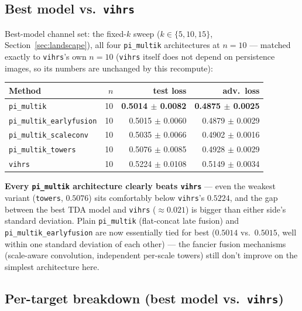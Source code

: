 \documentclass[11pt]{article}
\begin{document}
\subsection{Best model vs.\ \texttt{vihrs}}
\label{sec:bestvsvihrs}

Best-model channel set: the fixed-$k$ sweep ($k\in\{5,10,15\}$,
Section~\ref{sec:landscape}), all four \texttt{pi\_multik} architectures at
$n=10$ — matched exactly to \texttt{vihrs}'s own $n=10$ (\texttt{vihrs} itself
does not depend on persistence images, so its numbers are unchanged by this
recompute):

\begin{center}
\begin{tabular}{@{}lrrr@{}}
\toprule
\textbf{Method} & \textbf{$n$} & \textbf{test loss} & \textbf{adv.\ loss} \\
\midrule
\texttt{pi\_multik}              & 10 & \textbf{0.5014 $\pm$ 0.0082} & \textbf{0.4875 $\pm$ 0.0025} \\
\texttt{pi\_multik\_earlyfusion} & 10 & 0.5015 $\pm$ 0.0060 & 0.4879 $\pm$ 0.0029 \\
\texttt{pi\_multik\_scaleconv}   & 10 & 0.5035 $\pm$ 0.0066 & 0.4902 $\pm$ 0.0016 \\
\texttt{pi\_multik\_towers}      & 10 & 0.5076 $\pm$ 0.0085 & 0.4928 $\pm$ 0.0029 \\
\texttt{vihrs}                   & 10 & 0.5224 $\pm$ 0.0108 & 0.5149 $\pm$ 0.0034 \\
\bottomrule
\end{tabular}
\end{center}

\textbf{Every \texttt{pi\_multik} architecture clearly beats \texttt{vihrs}}
— even the weakest variant (\texttt{towers}, $0.5076$) sits comfortably below
\texttt{vihrs}'s $0.5224$, and the gap between the best TDA model and
\texttt{vihrs} ($\approx 0.021$) is bigger than either side's standard
deviation. Plain \texttt{pi\_multik} (flat-concat late fusion) and
\texttt{pi\_multik\_earlyfusion} are now essentially tied for best
($0.5014$ vs.\ $0.5015$, well within one standard deviation of each other) —
the fancier fusion mechanisms (scale-aware convolution, independent per-scale
towers) still don't improve on the simplest architecture here.

\subsection{Per-target breakdown (best model vs.\ \texttt{vihrs})}
\end{document}
